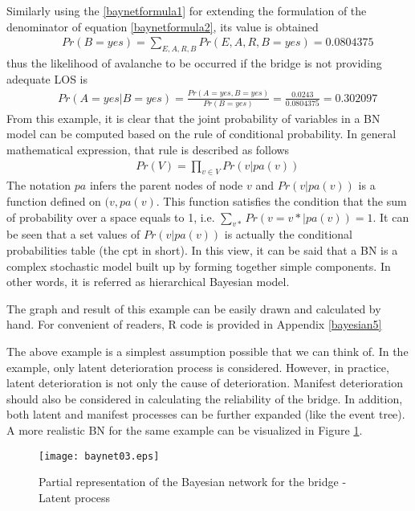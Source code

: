 Similarly using the \eqref{baynetformula1} for extending the formulation of the denominator of equation \eqref{baynetformula2}, its value is obtained
%
\begin{eqnarray}
 && Pr(B=yes)= \sum_{E,A,R,B} Pr(E,A,R,B=yes)=0.0804375
\end{eqnarray}
thus the likelihood of avalanche to be occurred if the bridge is not providing adequate LOS is
\begin{eqnarray}
 && Pr(A=yes|B=yes)= \frac{Pr(A=yes,B=yes)}{Pr(B=yes)} =  \frac{0.0243}{0.0804375}=0.302097 \nonumber
\end{eqnarray}
%
From this example, it is clear that the joint probability of variables in a BN model can be computed based on the rule of conditional probability. In general mathematical expression, that rule is described as follows
%
\begin{eqnarray}
 && Pr(V)=\prod_{v\in V} Pr(v|pa(v)) \label{baynetformula12} 
\end{eqnarray}
The notation $pa$ infers the parent nodes of node $v$ and $Pr(v|pa(v))$ is a function defined on $(v,pa(v)$. This function satisfies the condition that the sum of probability over a space equals to 1, i.e. $\sum_{v*}Pr(v=v*|pa(v))=1$. It can be seen that a set values of $Pr(v|pa(v))$ is actually the conditional probabilities table (the cpt in short). In this view, it can be said that a BN is a complex stochastic model built up by forming together simple components. In other words, it is referred as hierarchical Bayesian model.

The graph and result of this example can be easily drawn and calculated by hand. For convenient of readers, R code is provided in Appendix \ref{bayesian5}

The above example is a simplest assumption possible that we can think of. In the example, only latent deterioration process is considered. However, in practice, latent deterioration is not only the cause of deterioration. Manifest deterioration should also be considered in calculating the reliability of the bridge. In addition, both latent and manifest processes can be further expanded (like the event tree). A more realistic BN for the same example can be visualized in Figure \ref{baynet03}.
\begin{figure}[h]
\begin{center}
\texttt{[image: baynet03.eps]}
\caption{Partial representation of the Bayesian network for the bridge - Latent process}\label{baynet03}
\end{center}
\end{figure}

